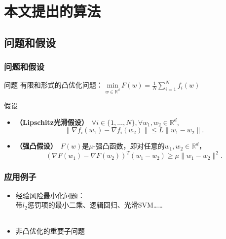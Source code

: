 \section{本文提出的算法}

\subsection{问题和假设}
\frame
{
\frametitle{问题和假设}
\begin{block}{问题}
有限和形式的凸优化问题：
$\underset{w \in \mathbb{R}^d}{\text{min}}\ F(w) = \frac{1}{N}\sum_{i=1}^{N} f_i(w)$
\end{block}

\pause

\begin{block}{假设}
\begin{itemize}
    \item \textbf{（Lipschitz光滑假设）}\
    $\forall i \in \{1, \ldots, N\}, \forall w_1, w_2 \in \mathbb{R}^d$,
    $$
    \| \nabla f_i(w_1) - \nabla f_i(w_2) \| \le L \| w_1 - w_2 \|.
    $$

    \item \textbf{（强凸假设）}\
	$F(w)$是$\mu$-强凸函数，即对任意的$w_1, w_2 \in \mathbb{R}^d$，
    $$
	    (\nabla F(w_1) - \nabla F(w_2))^T(w_1 - w_2) \ge \mu \| w_1 - w_2 \|^2.
    $$
\end{itemize}
\end{block}
}

\frame
{
\frametitle{应用例子}
\begin{itemize}
    \item 经验风险最小化问题： \\
    带$l_2$惩罚项的最小二乘、逻辑回归、光滑SVM……\\~\\
    \item 非凸优化的重要子问题

\end{itemize}
}

